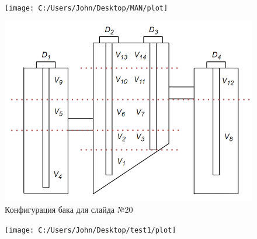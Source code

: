\documentclass[usenames,dvipsnames,11pt]{beamer}
\begin{document}
\begin{frame}
	\begin{figure}
	\centering
	\texttt{[image: C:/Users/John/Desktop/MAN/plot]}
	\end{figure}
\end{frame}

\begin{frame}
	\begin{figure}
	\centering
	\includegraphics[width=0.85\linewidth]{graphics/screenshot011}
	Конфигурация бака для слайда №20
	\end{figure}
\end{frame}

\begin{frame}
	\begin{figure}
	\centering
	\texttt{[image: C:/Users/John/Desktop/test1/plot]}
	\end{figure}
\end{frame}
\end{document}
